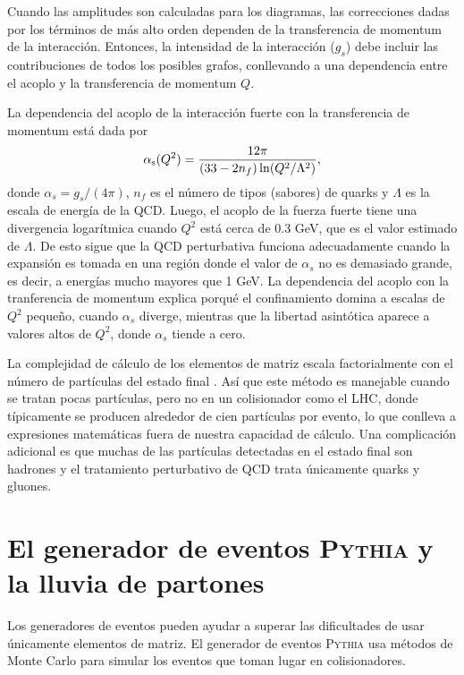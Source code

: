 Cuando las amplitudes son calculadas para los diagramas, las correcciones dadas por los términos de más alto orden dependen de la transferencia de momentum de la interacción. Entonces, la intensidad de la interacción ($g_s$) debe incluir las contribuciones de todos los posibles grafos, conllevando a una dependencia entre el acoplo y la transferencia de momentum $Q$.

La dependencia del acoplo de la interacción fuerte con la transferencia de momentum está dada por
\begin{equation}
\alpha_{\mathrm{s}}(Q^2) = \frac{12 \pi}{(33-2n_f)\ln(Q^2/\Lambda^2)},
\label{eq:alphastrong}
\end{equation}
donde $\alpha_s=g_s/(4\pi)$, $n_f$ es el número de tipos (sabores) de quarks y $\Lambda$ es la escala de energía de la QCD. Luego, el acoplo de la fuerza fuerte tiene una divergencia logarítmica cuando $Q^2$ está cerca de $0.3$ GeV, que es el valor estimado de $\Lambda$. De esto sigue que la QCD perturbativa funciona adecuadamente cuando la expansión es tomada en una región donde el valor de $\alpha_s$ no es demasiado grande, es decir, a energías mucho mayores que 1 GeV. La dependencia del acoplo con la tranferencia de momentum explica porqué el confinamiento domina a escalas de $Q^2$ pequeño, cuando $\alpha_s$ diverge, mientras que la libertad asintótica aparece a valores altos de $Q^2$, donde $\alpha_s$ tiende a cero.

La complejidad de cálculo de los elementos de matriz escala factorialmente con el número de partículas del estado final \cite{Peskin:1995}. Así que este método es manejable cuando se tratan pocas partículas, pero no en un colisionador como el LHC, donde típicamente se producen alrededor de cien partículas por evento, lo que conlleva a expresiones matemáticas fuera de nuestra capacidad de cálculo. Una complicación adicional es que muchas de las partículas detectadas en el estado final son hadrones y el tratamiento perturbativo de QCD trata únicamente quarks y gluones.

\section{El generador de eventos \textsc{Pythia} y la lluvia de partones}

Los generadores de eventos pueden ayudar a superar las dificultades de usar únicamente elementos de matriz. El generador de eventos \textsc{Pythia} usa métodos de Monte Carlo para simular los eventos que toman lugar en colisionadores.

